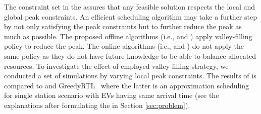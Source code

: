 

			
 The constraint set in the \MCSP assures that any feasible solution respects the local and global peak constraints.
An efficient scheduling algorithm may take a further step by not only satisfying the peak constraints but to further reduce the peak as much as possible. The proposed offline algorithms (i.e., \ics and \fcs) apply valley-filling policy to reduce the peak. The  online algorithms (i.e., \iocs and \focs) do not apply the same policy as they do not have future knowledge to be able to balance allocated resources. 
To investigate the effect of employed valley-filling strategy, we conducted a set of simulations by varying local peak constraints. 
The results of \ics is compared to \iocs and GreedyRTL~\cite{Jain} where the latter is an approximation scheduling for single station scenario with EVs having same arrival time (see the explanations after formulating the \MCSP in Section \ref{sec:problem}). 
